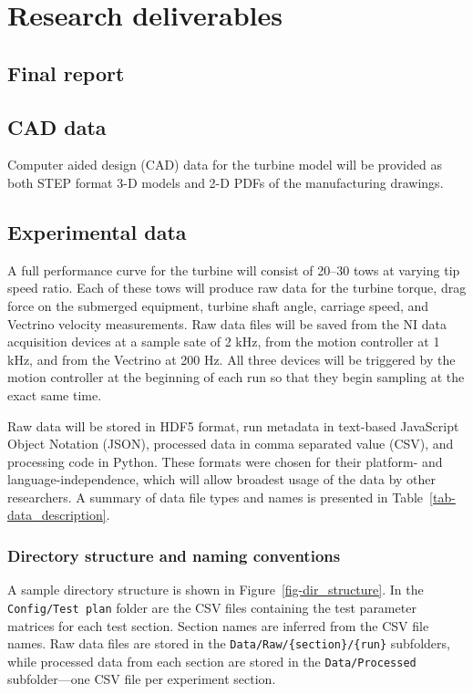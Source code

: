 \documentclass[12pt,letterpaper]{scrreprt}
\begin{document}
\chapter{Research deliverables}

\section{Final report}


\section{CAD data}

Computer aided design (CAD) data for the turbine model will be provided as both
STEP format 3-D models and 2-D PDFs of the manufacturing drawings.

\section{Experimental data}

A full performance curve for the turbine will consist of 20--30 tows at varying
tip speed ratio. Each of these tows will produce raw data for the turbine
torque, drag force on the submerged equipment, turbine shaft angle, carriage
speed, and Vectrino velocity measurements. Raw data files will be saved from the
NI data acquisition devices at a sample sate of 2 kHz, from the motion
controller at 1 kHz, and from the Vectrino at 200 Hz. All three devices will be
triggered by the motion controller at the beginning of each run so that they
begin sampling at the exact same time.

Raw data will be stored in HDF5 format, run metadata in text-based JavaScript
Object Notation (JSON), processed data in comma separated value (CSV), and
processing code in Python. These formats were chosen for their platform- and
language-independence, which will allow broadest usage of the data by other
researchers. A summary of data file types and names is presented in
Table~\ref{tab-data_description}.


\subsection{Directory structure and naming conventions}

A sample directory structure is shown in Figure~\ref{fig-dir_structure}. In the
\texttt{Config/Test plan} folder are the CSV files containing the test parameter
matrices for each test section. Section names are inferred from the CSV file
names. Raw data files are stored in the \texttt{Data/Raw/\{section\}/\{run\}}
subfolders, while processed data from each section are stored in the
\texttt{Data/Processed} subfolder---one CSV file per experiment section.
\end{document}
